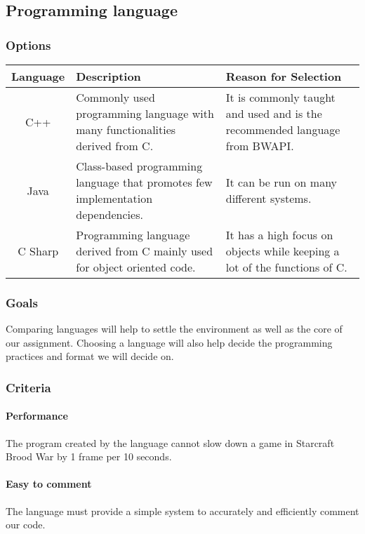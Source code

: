 \documentclass[10pt,letterpaper,onecolumn,draftclsnofoot]{IEEEtran}
\begin{document}
\subsection{Programming language}
\subsubsection{Options}
\begin{center}
\begin{tabular}{ ||C|L|L|| } 
\hline
Language & Description & Reason for Selection \\
 \hline
 C++ & Commonly used programming language with many functionalities derived from C. & It is commonly taught and used and is the recommended language from BWAPI. \\ 
 \hline
 Java & Class-based programming language that promotes few implementation dependencies. & It can be run on many different systems.\\ 
 \hline
 C Sharp & Programming language derived from C mainly used for object oriented code. & It has a high focus on objects while keeping a lot of the functions of C. \\ 
 \hline
\end{tabular}
\end{center}

\subsubsection{Goals}
Comparing languages will help to settle the environment as well as the core of our assignment. Choosing a language will also help decide the programming practices and format we will decide on.

\subsubsection{Criteria}
\paragraph{Performance}
The program created by the language cannot slow down a game in Starcraft Brood War by 1 frame per 10 seconds.

\paragraph{Easy to comment}
The language must provide a simple system to accurately and efficiently comment our code.
\end{document}

